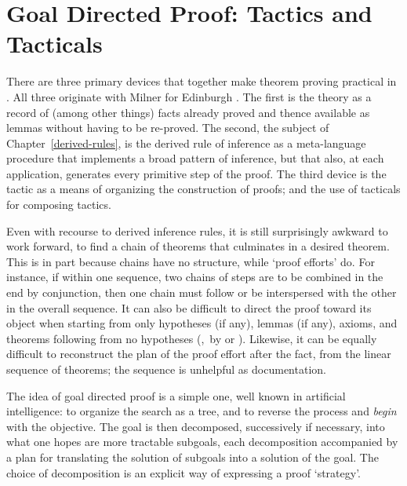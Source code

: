 \chapter{Goal Directed Proof: Tactics and Tacticals}

\label{tactics-and-tacticals}

There are three primary devices that together make theorem proving practical
in \HOL. All three originate with Milner
%
%
for Edinburgh \LCF.
The first is the theory as
a record of (among other things) facts already proved
and thence available as lemmas
without having to be re-proved.  The second,
the subject of Chapter~\ref{derived-rules}, is the
derived rule of inference as a meta-language procedure that implements a
broad pattern of inference, but that also, at each application,
generates every primitive step of the proof. The third device is
the tactic as a means of organizing the construction of proofs;
and the use of tacticals for composing tactics.

Even with recourse to derived inference rules, it is still surprisingly awkward to work forward,  to find a chain of theorems that culminates in a desired theorem.
This is in part because chains have no structure, while `proof efforts' do.  For instance, if within one sequence, two chains of steps are to be combined in the end by conjunction, then one chain must follow or be interspersed with the other in the overall sequence.
It can also be difficult to direct the proof toward its object when starting from only hypotheses (if any), lemmas (if any), axioms, and theorems following from no hypotheses (\eg,\ by  or ).
%
Likewise, it can be equally difficult to reconstruct the plan of the proof effort after the fact, from the linear sequence of theorems; the sequence is unhelpful as documentation.

The idea of goal directed proof is a simple one, well known in
artificial intelligence: to organize the search as a tree, and to reverse
the process and {\it begin\/} with the objective. The goal is then
decomposed, successively if necessary,
into what one hopes are more tractable subgoals, each decomposition
accompanied by a
plan for translating the solution of subgoals into a solution of the goal.
The choice of decomposition is an explicit way of expressing a proof
`strategy'.

